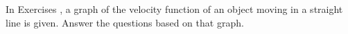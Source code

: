 {\noindent In Exercises}
{, a graph of the velocity function of an object moving in a straight line is given. Answer the questions based on that graph.}
